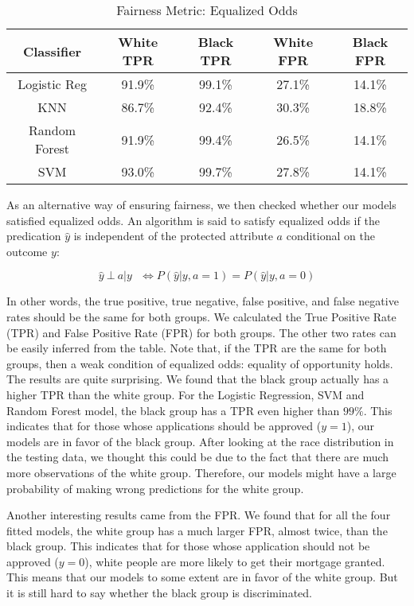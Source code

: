 \documentclass[letterpaper, 10 pt, conference]{ieeeconf}  %
\begin{document}
\begin{itemize}
\begin{table}[h]
\centering
\caption{Fairness Metric: Equalized Odds}
\begin{tabular}{|c|c|c|c|c|}
\hline
Classifier & White TPR & Black TPR & White FPR & Black FPR \\\hline
Logistic Reg & 91.9\% & 99.1\% & 27.1\% & 14.1\%\\\hline
KNN &  86.7\% & 92.4\% & 30.3\% & 18.8\% \\\hline
Random Forest & 91.9\% & 99.4\% & 26.5\% & 14.1\%\\\hline
SVM  & 93.0\% & 99.7\% & 27.8\% & 14.1\%\\\hline
\end{tabular}
\end{table}

As an alternative way of ensuring fairness, we then checked whether our models satisfied equalized odds. An algorithm is said to satisfy equalized odds if the predication $\hat{y}$ is independent of the protected attribute $a$ conditional on the outcome $y$:

\begin{equation}
    \hat{y}\ \bot \  a|y \ \ \  \Longleftrightarrow P(\hat{y}|y,a=1)=P(\hat{y}|y,a=0)
\end{equation}

In other words, the true positive, true negative, false positive,
and false negative rates should be the same for both groups. We calculated the True Positive Rate (TPR) and False Positive Rate (FPR) for both groups. The other two rates can be easily inferred from the table. Note that, if the TPR are the same for both groups, then a weak condition of equalized odds: equality of opportunity holds. The results are quite surprising. We found that the black group actually has a higher TPR than the white group. For the Logistic Regression, SVM and Random Forest model, the black group has a TPR even higher than $99\%$. This indicates that for those whose applications should be approved ($y = 1$), our models are in favor of the black group. After looking at the race distribution in the testing data, we thought this could be due to the fact that there are much more observations of the white group. Therefore, our models might have a large probability of making wrong predictions for the white group.

Another interesting results came from the FPR. We found that for all the four fitted models, the white group has a much larger FPR, almost twice, than the black group. This indicates that for those whose application should not be approved ($y=0$), white people are more likely to get their mortgage granted. This means that our models to some extent are in favor of the white group. But it is still hard to say whether the black group is discriminated.


\end{itemize}
\end{document}
